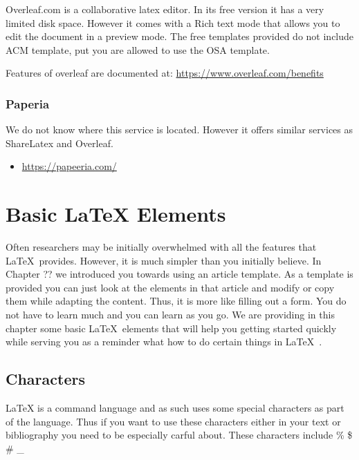 Overleaf.com is a collaborative latex editor. In its free version it has
a very limited disk space. However it comes with a Rich text mode that
allows you to edit the document in a preview mode. The free templates
provided do not include ACM template, put you are allowed to use the OSA
template.

Features of overleaf are documented at:
\url{https://www.overleaf.com/benefits}

\subsubsection{Paperia}\label{paperia}

We do not know where this service is located. However it offers similar
services as ShareLatex and Overleaf.

\begin{itemize}

\item
  \url{https://papeeria.com/}
\end{itemize}


\section{Basic LaTeX Elements}\label{latex}

Often researchers may be initially overwhelmed with all the features
that \LaTeX~provides. However, it is much simpler than you initially
believe. In Chapter ?? we introduced you towards using an article
template. As a template is provided you can just look at the elements
in that article and modify or copy them while adapting the
content. Thus, it is more like filling out a form. You do not have to
learn much and you can learn as you go. We are providing in this
chapter some basic \LaTeX~elements that will help you getting started
quickly while serving you as a reminder what how to do certain things
in \LaTeX~.



\subsection{Characters}\label{characters}

LaTeX is a command language and as such uses some special characters as
part of the language. Thus if you want to use these characters either in
your text or bibliography you need to be especially carful about. These
characters include \% \$ \# \_


